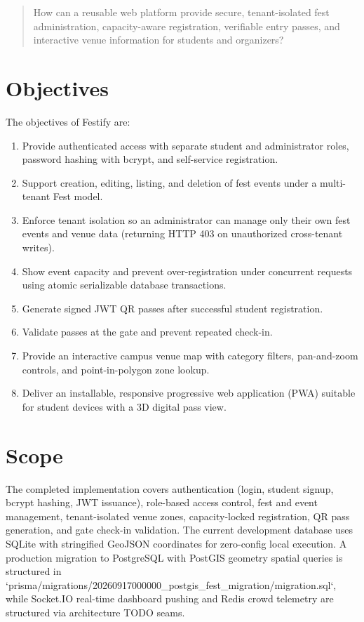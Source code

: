 \documentclass[11pt,a4paper]{report}
\begin{document}
\begin{quote}
How can a reusable web platform provide secure, tenant-isolated fest administration,
capacity-aware registration, verifiable entry passes, and interactive venue information
for students and organizers?
\end{quote}

\section{Objectives}
The objectives of Festify are:
\begin{enumerate}
  \item Provide authenticated access with separate student and administrator roles, password hashing with bcrypt, and self-service registration.
  \item Support creation, editing, listing, and deletion of fest events under a multi-tenant Fest model.
  \item Enforce tenant isolation so an administrator can manage only their own fest events and venue data (returning HTTP 403 on unauthorized cross-tenant writes).
  \item Show event capacity and prevent over-registration under concurrent requests using atomic serializable database transactions.
  \item Generate signed JWT QR passes after successful student registration.
  \item Validate passes at the gate and prevent repeated check-in.
  \item Provide an interactive campus venue map with category filters, pan-and-zoom controls, and point-in-polygon zone lookup.
  \item Deliver an installable, responsive progressive web application (PWA) suitable for student devices with a 3D digital pass view.
\end{enumerate}

\section{Scope}
The completed implementation covers authentication (login, student signup, bcrypt hashing, JWT issuance), role-based access control, fest and event management, tenant-isolated venue zones, capacity-locked registration, QR pass generation, and gate check-in validation. The current development database uses SQLite with stringified GeoJSON coordinates for zero-config local execution. A production migration to PostgreSQL with PostGIS geometry spatial queries is structured in `prisma/migrations/20260917000000_postgis_fest_migration/migration.sql`, while Socket.IO real-time dashboard pushing and Redis crowd telemetry are structured via architecture TODO seams.
\end{document}
